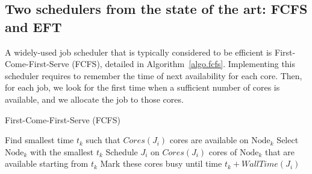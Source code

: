 \documentclass[sigconf,review,anonymous]{acmart}
\newcommand{\Node}[1]{\ensuremath{\mathrm{Node}_{#1}}\xspace}
\newcommand{\core}{\mathit{Cores}\xspace}
\newcommand{\walltime}{\mathit{WallTime}\xspace}
\newcommand{\nodeset}{\ensuremath{\mathbb{N}}\xspace}
\begin{document}

\subsection{Two schedulers from the state of the art: FCFS and EFT}\label{subsec.fcfs_eft}

A widely-used job scheduler that is typically considered to be efficient is
First-Come-First-Serve (FCFS), detailed in
Algorithm~\ref{algo.fcfs}. Implementing this scheduler requires to
remember the time of next availability for each core. Then, for each job, we look
for the first time when a sufficient number of cores is available, and we allocate the job to
those cores.


\begin{algorithm}[htbp]%
\caption{First-Come-First-Serve (FCFS)}\label{algo.fcfs}
\begin{algorithmic}[1]
        \ForEach{$\Node{k} \in \nodeset$}
        \State Find smallest time $t_k$ such that $\core(J_i)$ cores are available on \Node{k}\label{fcfs.ln.find}
        \EndFor
        \State Select \Node{k}  with the smallest $t_k$
        \State Schedule $J_i$ on $\core(J_i)$ cores of \Node{k} that are available starting from $t_k$
        \State Mark these cores busy until time $t_k +\walltime(J_i)$
	\EndFor
	\end{algorithmic}
\end{algorithm}
\end{document}
